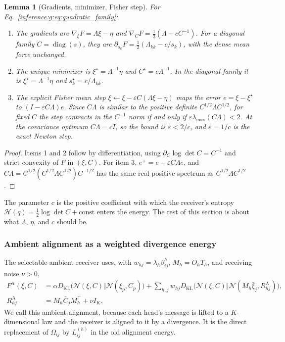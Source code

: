 \documentclass[11pt]{article}
\newtheorem{lemma}[theorem]{Lemma}
\theoremstyle{definition}
\theoremstyle{remark}
\providecommand{\KL}{D_{\mathrm{KL}}}
\providecommand{\diag}{\operatorname{diag}}
\providecommand{\N}{\mathcal{N}}
\providecommand{\Hent}{\mathcal{H}}
\begin{document}
\begin{lemma}[Gradients, minimizer, Fisher step]
\label{inference:g:lem:family}
For Eq.~\eqref{inference:g:eq:quadratic_family}:
\begin{enumerate}
\item The gradients are $\nabla_\xi F=\Lambda\xi-\eta$ and $\nabla_CF=\tfrac12(\Lambda-c C^{-1})$. For a diagonal family $C=\diag(s)$, they are $\partial_{s_k}F=\tfrac12(\Lambda_{kk}-c/s_k)$, with the dense mean force unchanged.
\item The unique minimizer is $\xi^\star=\Lambda^{-1}\eta$ and $C^\star=c\Lambda^{-1}$. In the diagonal family it is $\xi^\star=\Lambda^{-1}\eta$ and $s_k^\star=c/\Lambda_{kk}$.
\item The explicit Fisher mean step $\xi\leftarrow\xi-\varepsilon C(\Lambda\xi-\eta)$ maps the error $e=\xi-\xi^\star$ to $(I-\varepsilon C\Lambda)e$. Since $C\Lambda$ is similar to the positive definite $C^{1/2}\Lambda C^{1/2}$, for fixed $C$ the step contracts in the $C^{-1}$ norm if and only if $\varepsilon\lambda_{\max}(C\Lambda)<2$. At the covariance optimum $C\Lambda=c I$, so the bound is $\varepsilon<2/c$, and $\varepsilon=1/c$ is the exact Newton step.
\end{enumerate}
\end{lemma}

\begin{proof}
Items 1 and 2 follow by differentiation, using $\partial_C\log\det C=C^{-1}$ and strict convexity of $F$ in $(\xi,C)$. For item 3, $e^+=e-\varepsilon C\Lambda e$, and $C\Lambda=C^{1/2}(C^{1/2}\Lambda C^{1/2})C^{-1/2}$ has the same real positive spectrum as $C^{1/2}\Lambda C^{1/2}$.
\end{proof}

The parameter $c$ is the positive coefficient with which the receiver's entropy $\Hent(q)=\tfrac12\log\det C+\text{const}$ enters the energy. The rest of this section is about what $\Lambda$, $\eta$, and $c$ should be.

\subsubsection{Ambient alignment as a weighted divergence energy}
\label{inference:g:sec:ambient}

The selectable ambient receiver uses, with $w_{hj}=\lambda_h\beta_{ij}^h$, $M_h=O_hT_h$, and receiving noise $\nu>0$,
\begin{equation}
\begin{split}
F^{\mathrm A}(\xi,C)&=\alpha\KL\bigl(\N(\xi,C)\Vert\N(\xi_p,C_p)\bigr)
+\sum_{h,j}w_{hj}\KL\bigl(\N(\xi,C)\Vert\N(M_h\bar\xi_j,R^{\mathrm A}_{hj})\bigr),\\
R^{\mathrm A}_{hj}&=M_h\bar C_jM_h^\top+\nu I_K.
\end{split}
\label{inference:g:eq:ambient}
\end{equation}
We call this ambient alignment, because each head's message is lifted to a $K$-dimensional law and the receiver is aligned to it by a divergence. It is the direct replacement of $\Omega_{ij}$ by $L_{ij}^{(h)}$ in the old alignment energy.
\end{document}
